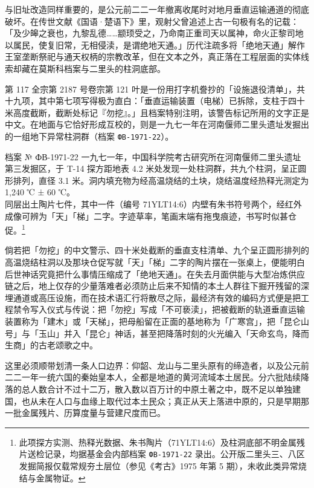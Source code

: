 与旧址改造同样重要的，是公元前二二一年撤离收尾时对地月垂直运输通道的彻底破坏。在传世文献《国语·楚语下》里，观射父曾追述上古一句极有名的记载：「及少皞之衰也，九黎乱德……颛顼受之，乃命南正重司天以属神，命火正黎司地以属民，使复旧常，无相侵渎，是谓绝地天通。」历代注疏多将「绝地天通」解作王室垄断祭祀与通天权柄的宗教改革，但在文本之外，真正落在工程层面的实体线索却藏在莫斯科档案与二里头的柱洞底部。

第 117 全宗第 2187 号卷宗第 121 叶是一份用打字机誊抄的「设施退役清单」，共十九项，其中第七项写得极为直白：「垂直运输装置（电梯）已拆除，支柱于四十米高度截断，截断处标记『勿挖』。」且档案特别注明，该警告标记所用的文字正是中文。在地面与它恰好形成互校的，则是一九七一年在河南偃师二里头遗址发掘出的一组地下异常柱洞群（档案 \texttt{ФВ-1971-22}）。

\begin{archive}{档案 № ФВ-1971-22}
一九七一年，中国科学院考古研究所在河南偃师二里头遗址第三发掘区，于 T-14 探方距地表 4.2 米处发现一处柱洞群，共九个柱洞，呈正圆形排列，直径 3.1 米。洞内填充物为经高温烧结的土块，烧结温度经热释光测定为 1{,}240 ℃ ± 60 ℃。\\
同层出土陶片七件，其中一件（编号 71YLT14:6）内壁有朱书符号两个，经红外成像可辨为「天」「梯」二字。字迹草率，笔画末端有拖曳痕迹，书写时似甚仓促。\footnote{此项探方实测、热释光数据、朱书陶片（71YLT14:6）及柱洞底部不明金属残片送检记录，均据基金会内部档案 \texttt{ФВ-1971-22} 录出。公开版二里头三、八区发掘简报仅载常规夯土层位（参见《考古》1975 年第 5 期），未收此类异常烧结与金属物证。}
\end{archive}

倘若把「勿挖」的中文警示、四十米处截断的垂直支柱清单、九个呈正圆形排列的高温烧结柱洞以及那块仓促写就「天」「梯」二字的陶片摆在一张桌上，便能明白后世神话究竟把什么事情压缩成了「绝地天通」。在失去月面供能与大型冶炼供应链之后，地上仅存的少量落难者必须防止后来不知情的本土人群往下掘开残留的深埋通道或高压设施，而在技术语汇行将散尽之际，最经济有效的编码方式便是把工程禁令写入仪式与传说：把「勿挖」写成「不可亵渎」，把被截断的轨道垂直运输装置称为「建木」或「天梯」，把母船留在正面的基地称为「广寒宫」，把「昆仑山号」与「玉山」并入「昆仑」神话，甚至把降落时刻的火光编入「天命玄鸟，降而生商」的古老颂歌之中。

这里必须顺带划清一条人口边界：仰韶、龙山与二里头原有的缔造者，以及公元前二二一年一统六国的秦始皇本人，全都是地道的黄河流域本土居民。分六批陆续降落的总人数合计不过十二万，散入数以百万计的中原土著之中，既不足以单独建国，也从未在人口与血缘上取代过本土民众；真正从天上落进中原的，只是早期那一批金属残片、历算度量与营建尺度而已。

